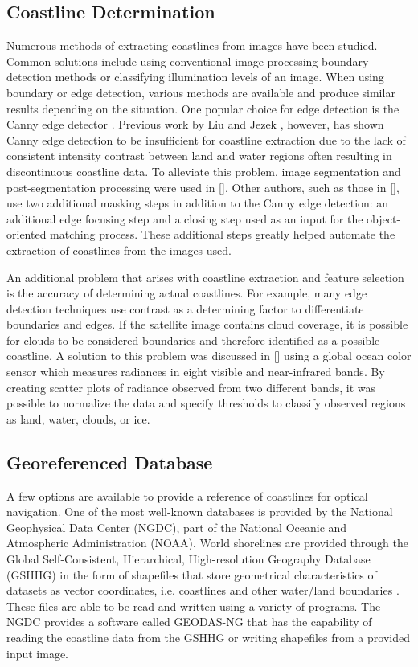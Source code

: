 \documentclass[]{aiaa-tc}%
\begin{document}
\subsection{Coastline Determination}
Numerous methods of extracting coastlines from images have been studied.  Common solutions include using conventional image processing boundary detection methods or classifying illumination levels of an image.  When using boundary or edge detection, various methods are available and produce similar results depending on the situation.  One popular choice for edge detection is the Canny edge detector \cite{Canny:1986}.  Previous work by Liu and Jezek \cite{Liu:2004}, however, has shown Canny edge detection to be insufficient for coastline extraction due to the lack of consistent intensity contrast between land and water regions often resulting in discontinuous coastline data.  To alleviate this problem, image segmentation and post-segmentation processing were used in [].  Other authors, such as those in [], use two additional masking steps in addition to the Canny edge detection: an additional edge focusing step and a closing step used as an input for the object-oriented matching process.  These additional steps greatly helped automate the extraction of coastlines from the images used.

An additional problem that arises with coastline extraction and feature selection is the accuracy of determining actual coastlines.  For example, many edge detection techniques use contrast as a determining factor to differentiate boundaries and edges.  If the satellite image contains cloud coverage, it is possible for clouds to be considered boundaries and therefore identified as a possible coastline.  A solution to this problem was discussed in [] using a global ocean color sensor which measures radiances in eight visible and near-infrared bands.  By creating scatter plots of radiance observed from two different bands, it was possible to normalize the data and specify thresholds to classify observed regions as land, water, clouds, or ice.  


\subsection{Georeferenced Database}
A few options are available to provide a reference of coastlines for optical navigation.  One of the most well-known databases is provided by the National Geophysical Data Center (NGDC), part of the National Oceanic and Atmospheric Administration (NOAA).  World shorelines are provided through the Global Self-Consistent, Hierarchical, High-resolution Geography Database (GSHHG) in the form of shapefiles that store geometrical characteristics of datasets as vector coordinates, i.e. coastlines and other water/land boundaries \cite{ESRITechDes}.  These files are able to be read and written using a variety of programs.  The NGDC provides a software called GEODAS-NG that has the capability of reading the coastline data from the GSHHG or writing shapefiles from a provided input image.  
\end{document}
